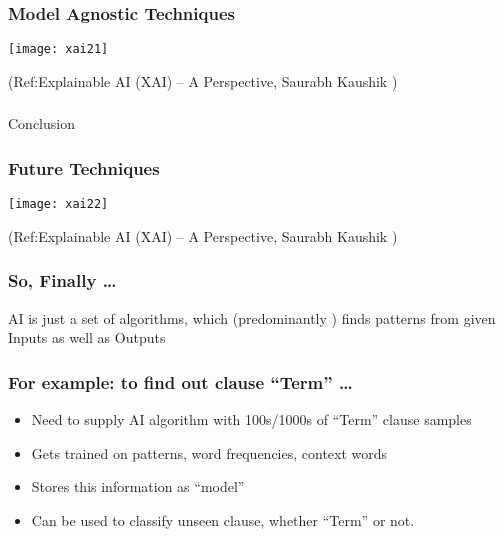 \begin{frame}[fragile]\frametitle{ Model Agnostic Techniques}
\begin{center}
\texttt{[image: xai21]}
\end{center}

\tiny{(Ref:Explainable AI (XAI) – A Perspective, Saurabh Kaushik  )}
\end{frame}


\begin{frame}[fragile]\frametitle{}
\begin{center}
{\Large Conclusion}
\end{center}
\end{frame}


\begin{frame}[fragile]\frametitle{Future Techniques}
\begin{center}
\texttt{[image: xai22]}
\end{center}

\tiny{(Ref:Explainable AI (XAI) – A Perspective, Saurabh Kaushik  )}
\end{frame}

\begin{frame}[fragile]\frametitle{So, Finally \ldots}

\begin{center}
AI is just a set of algorithms, 
which (predominantly ) finds patterns from given Inputs as well as Outputs
\end{center}
\end{frame}

\begin{frame}[fragile]\frametitle{For example: to find out clause ``Term'' \ldots}
\begin{itemize}
\item Need to supply AI algorithm with 100s/1000s of ``Term'' clause samples
\item Gets trained on patterns, word frequencies, context words
\item Stores this information as ``model''
\item Can be used to classify unseen clause, whether ``Term'' or not.
\end{itemize}
\end{frame}

